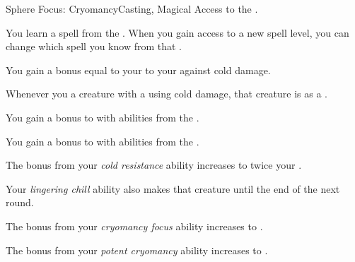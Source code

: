     \begin{feat}{Sphere Focus: Cryomancy}{Casting, Magical}
        \featpre Access to the  .

         You learn a spell from the  .
        When you gain access to a new spell level, you can change which spell you know from that .

         You gain a bonus equal to your  to your  against cold damage.

         Whenever you  a creature with a  using cold damage, that creature is  as a .

         You gain a  bonus to  with abilities from the  .

         You gain a  bonus to  with abilities from the  .

         The bonus from your \textit{cold resistance} ability increases to twice your .

         Your \textit{lingering chill} ability also makes that creature  until the end of the next round.

         The bonus from your \textit{cryomancy focus} ability increases to .

         The bonus from your \textit{potent cryomancy} ability increases to .
    \end{feat}

